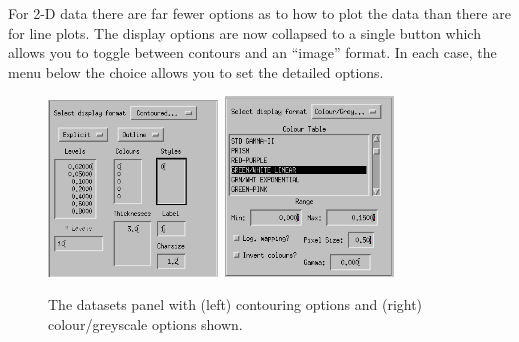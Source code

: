 \documentclass[11pt,twoside,english]{article}
\begin{document}
For 2-D data there are far fewer options as to how to plot the data
than there are for line plots. The display options are now collapsed to
a single button which allows you to toggle between contours and an
{}``image'' format.  In each case, the menu below the choice allows you
to set the detailed options.
\begin{figure}[htbp]
  \centering
  \includegraphics[width=0.4\textwidth]{main-ds3a}~\includegraphics[width=0.4\textwidth]{main-ds2}
  \caption{The datasets panel with (left) contouring options and
    (right) colour/greyscale options shown.}
  \label{contour}
\end{figure}
\end{document}
